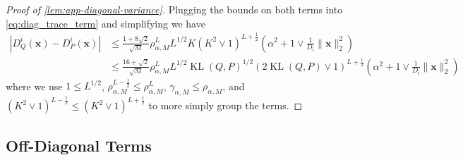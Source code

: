 \documentclass[twoside]{article}
\renewcommand{\ss}[1]{_{\text{#1}}}
\newcommand{\vx}{\mathbf{x}}
\renewcommand{\P}{\mathbb{P}}
\newcommand{\Q}{\mathbb{Q}}
\renewcommand{\Q}{\ensuremath{Q}}
\renewcommand{\P}{\ensuremath{P}}
\newcommand{\KL}{\operatorname{KL}}
\renewcommand{\ss}[1]{_{\text{#1}}}        %
\theoremstyle{theoremstyle}
\begin{document}
\begin{proof}[Proof of \cref{lem:app-diagonal-variance}]
Plugging the bounds on both terms into \cref{eq:diag_trace_term} and simplifying we have
\begin{align}
    |D^{i}_{\Q}(\vx) - D^{i}_{\P}(\vx)| 
    &\leq  
    \tfrac{1+8\sqrt{2}}{\sqrt{M}} 
    \rho_{\alpha, M}^{L} L^{1/2} K (K^2 \lor 1)^{L+\tfrac12}\left(\alpha^2 + 1\lor \tfrac1{D\ss{i}}\|\vx\|^2_2\right) \\
    &\leq  
    \tfrac{16 + \sqrt{2}}{\sqrt{M}} 
    \rho_{\alpha, M}^{L} L^{1/2} \KL(\Q,P)^{1/2} (2 \KL(\Q,\P) \lor 1)^{L+\tfrac12}\left(\alpha^2 + 1\lor \tfrac1{D\ss{i}}\|\vx\|^2_2\right)
\end{align}
where we use $1\le L^{1/2}$, $\rho_{\alpha, M}^{L-\tfrac12}\le \rho_{\alpha, M}^L$, $\gamma_{\alpha,M} \le \rho_{\alpha,M}$,
and $(K^2 \lor 1)^{L-\tfrac12} \le (K^2 \lor 1)^{L+\tfrac12}$ to more simply group the terms. 

\end{proof}



\subsection{Off-Diagonal Terms}\label{app:variance-off-diagonal}
\end{document}
